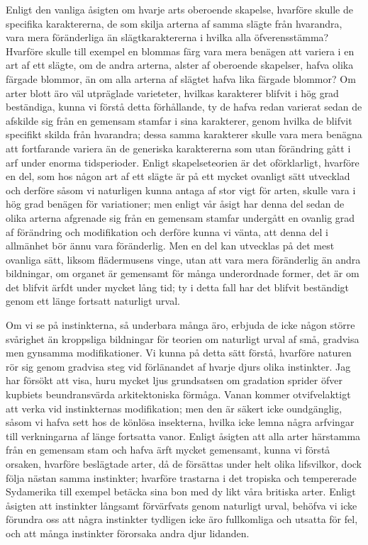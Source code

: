 Enligt den vanliga åsigten om hvarje arts oberoende skapelse, hvarföre skulle de specifika karaktererna, de som skilja arterna af samma slägte från hvarandra, vara mera föränderliga än slägtkaraktererna i hvilka alla öfverensstämma? Hvarföre skulle till exempel en blommas färg vara mera benägen att variera i en art af ett slägte, om de andra arterna, alster af oberoende skapelser, hafva olika färgade blommor, än om alla arterna af slägtet hafva lika färgade blommor? Om arter blott äro väl utpräglade varieteter, hvilkas karakterer blifvit i hög grad beständiga, kunna vi förstå detta förhållande, ty de hafva redan varierat sedan de afskilde sig från en gemensam stamfar i sina karakterer, genom hvilka de blifvit specifikt skilda från hvarandra; dessa samma karakterer skulle vara mera benägna att fortfarande variera än de generiska karaktererna som utan förändring gått i arf under enorma tidsperioder. Enligt skapelseteorien är det oförklarligt, hvarföre en del, som hos någon art af ett slägte är på ett mycket ovanligt sätt utvecklad och derföre såsom vi naturligen kunna antaga af stor vigt för arten, skulle vara i hög grad benägen för variationer; men enligt vår åsigt har denna del sedan de olika arterna afgrenade sig från en gemensam stamfar undergått en ovanlig grad af förändring och modifikation och derföre kunna vi vänta, att denna del i allmänhet bör ännu vara föränderlig. Men en del kan utvecklas på det mest ovanliga sätt, liksom flädermusens vinge, utan att vara mera föränderlig än andra bildningar, om organet är gemensamt för många underordnade former, det är om det blifvit ärfdt under mycket lång tid; ty i detta fall har det blifvit beständigt genom ett länge fortsatt naturligt urval.

Om vi se på instinkterna, så underbara många äro, erbjuda de icke någon större svårighet än kroppsliga bildningar för teorien om naturligt urval af små, gradvisa men gynsamma modifikationer. Vi kunna på detta sätt förstå, hvarföre naturen rör sig genom gradvisa steg vid förlänandet af hvarje djurs olika instinkter. Jag har försökt att visa, huru mycket ljus grundsatsen om gradation sprider öfver kupbiets beundransvärda arkitektoniska förmåga. Vanan kommer otvifvelaktigt att verka vid instinkternas modifikation; men den är säkert icke oundgänglig, såsom vi hafva sett hos de könlösa insekterna, hvilka icke lemna några arfvingar till verkningarna af länge fortsatta vanor. Enligt åsigten att alla arter härstamma från en gemensam stam och hafva ärft mycket gemensamt, kunna vi förstå orsaken, hvarföre beslägtade arter, då de försättas under helt olika lifsvilkor, dock följa nästan samma instinkter; hvarföre trastarna i det tropiska och tempererade Sydamerika till exempel betäcka sina bon med dy likt våra britiska arter. Enligt åsigten att instinkter långsamt förvärfvats genom naturligt urval, behöfva vi icke förundra oss att några instinkter tydligen icke äro fullkomliga och utsatta för fel, och att många instinkter förorsaka andra djur lidanden.


